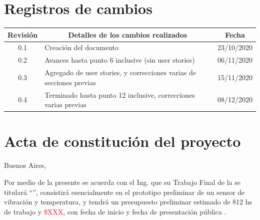 \documentclass[11pt]{charter}
\begin{document}
\maketitle
\thispagestyle{empty}
\pagebreak


\thispagestyle{empty}
{\setlength{\parskip}{0pt}
\tableofcontents{}
}
\pagebreak


\section{Registros de cambios}
\label{sec:registro}


\begin{table}[ht]
\label{tab:registro}
\centering
\begin{tabularx}{\linewidth}{@{}|c|X|c|@{}}
\hline
\rowcolor[HTML]{C0C0C0} 
Revisión & \multicolumn{1}{c|}{\cellcolor[HTML]{C0C0C0}Detalles de los cambios realizados} & Fecha      \\ \hline
0.1      & Creación del documento                                          & 23/10/2020 \\ \hline
0.2      & Avances hasta punto 6 inclusive (sin user stories)                                         & 06/11/2020 \\ \hline
0.3      & Agregado de user stories, y correcciones varias de secciones previas                                         & 15/11/2020 \\ \hline
0.4      & Terminado hasta punto 12 inclusive, correcciones varias previas & 08/12/2020 \\ \hline
\end{tabularx}
\end{table}

\pagebreak



\section{Acta de constitución del proyecto}
\label{sec:acta}

\begin{flushright}
Buenos Aires, \fechaInicioName
\end{flushright}

\vspace{2cm}

Por medio de la presente se acuerda con el Ing. \authorname\hspace{1px} que su Trabajo Final de la \degreename\hspace{1px} se titulará ``\ttitle'', consistirá esencialmente en el prototipo preliminar de un sensor de vibración y temperatura, y tendrá un presupuesto preliminar estimado de 812 hs de trabajo y \textcolor{red}{\$XXX}, con fecha de inicio \fechaInicioName\hspace{1px} y fecha de presentación pública \fechaFinalName.
\end{document}
